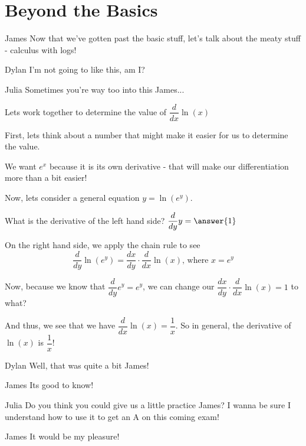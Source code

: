 \documentclass{ximera}
\begin{document}
\section{Beyond the Basics}
\begin{dialogue}
\item[James] Now that we've gotten past the basic stuff, let's talk about the meaty stuff - calculus with logs!
\item[Dylan] I'm not going to like this, am I?
\item[Julia] Sometimes you're way too into this James...
\end{dialogue}
\begin{example}
Lets work together to determine the value of $\dfrac{d}{dx}\ln(x)$
\begin{explanation}
First, lets think about a number that might make it easier for us to determine the value.
\begin{multipleChoice}
\choice{$\pi$}
\end{multipleChoice}
\begin{feedback}
We want $e^x$ because it is its own derivative - that will make our differentiation more than a bit easier!
\end{feedback}

Now, lets consider a general equation $y = \ln(e^y)$.

What is the derivative of the left hand side?
$\dfrac{d}{dy}y = \answer{1}$

On the right hand side, we apply the chain rule to see $$\dfrac{d}{dy} \ln(e^y) = \dfrac{dx}{dy} \cdot \dfrac{d}{dx}\ln(x) \text{, where } x = e^y$$

Now, because we know that $\dfrac{d}{dy}e^y = e^y$, we can change our $\dfrac{dx}{dy}\cdot\dfrac{d}{dx}\ln(x) = 1$ to what?

\begin{multipleChoice}
\end{multipleChoice}
\begin{feedback}
And thus, we see that we have $\dfrac{d}{dx}\ln(x) = \dfrac{1}{x}$. So in general, the derivative of $\ln(x)$ is $\dfrac{1}{x}$!
\end{feedback}
\end{explanation}
\end{example}

\begin{dialogue}
\item[Dylan] Well, that was quite a bit James!
\item[James] Its good to know!
\item[Julia] Do you think you could give us a little practice James? I wanna be sure I understand how to use it to get an A on this coming exam!
\item[James] It would be my pleasure!
\end{dialogue}
\end{document}
